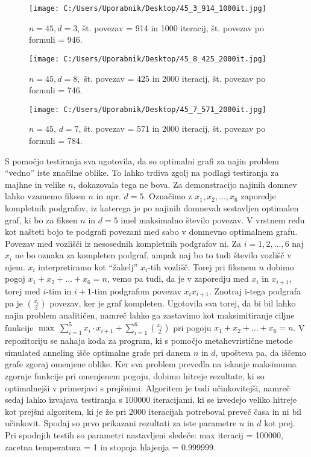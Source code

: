 \documentclass[12pt,a4paper]{amsart}
\theoremstyle{definition} %
\theoremstyle{plain} %
\begin{document}
\begin{figure}[h]
    \centering
    \texttt{[image: C:/Users/Uporabnik/Desktop/45\_3\_914\_1000it.jpg]} 
    \caption{$n = 45, d = 3$, št. povezav = 914 in 1000 iteracij, št. povezav po formuli = 946.}
    \label{fig:slika3}
\end{figure}

\break

\begin{figure}[h]
    \centering
    \texttt{[image: C:/Users/Uporabnik/Desktop/45\_8\_425\_2000it.jpg]} 
    \caption{$n = 45, d = 8,$ št. povezav = 425 in 2000 iteracij, št. povezav po formuli = 746.}
    \label{fig:slika3}
\end{figure}

\begin{figure}[h]
    \centering
    \texttt{[image: C:/Users/Uporabnik/Desktop/45\_7\_571\_2000it.jpg]} 
    \caption{$n = 45$, $d = 7$, št. povezav = 571 in 2000 iteracij, št. povezav po formuli = 784.}
    \label{fig:slika3}
\end{figure}

\noindent S pomočjo testiranja sva ugotovila, da so optimalni grafi za najin problem \enquote{vedno} iste značilne oblike.
To lahko trdiva zgolj na podlagi testiranja za majhne in velike $n$, dokazovala tega ne bova. 
Za demonstracijo najinih domnev lahko vzamemo fiksen $n$ in npr. $d = 5$. Označimo z $ x_1, x_2, \ldots, x_6 $ zaporedje kompletnih 
podgrafov, iz katerega je po najinih domnevah sestavljen optimalen graf, ki bo za fiksen $n$ in $d = 5$ imel maksimalno število povezav.
V vrstnem redu kot našteti bojo te podgrafi povezani med sabo v domnevno optimalnem grafu. Povezav med vozlišči iz nesosednih kompletnih podgrafov ni.
Za $i = 1, 2, \ldots, 6$ naj $x_i$ ne bo oznaka za kompleten podgraf, ampak naj bo to tudi število vozlišč v njem. $x_i$ interpretiramo kot \enquote{žakelj}
$x_i$-tih vozlišč.
Torej pri fiksnem $n$ dobimo pogoj $ x_1 + x_2 + \ldots + x_6 = n $, vemo pa tudi, da je v zaporedju med $x_i$ in $x_{i+1}$, torej 
med $i$-tim in $i+1$-tim podgrafom povezav $x_ix_{i+1}$.
Znotraj i-tega podgrafa pa je $\binom{x_i}{2}$ povezav, ker je graf kompleten. Ugotovila sva torej, da bi bil lahko najin problem 
analitičen, namreč lahko ga zastavimo kot maksimitiranje ciljne funkcije $\max\ \sum_{i=1}^{5} x_i \cdot x_{i+1} + \sum_{i=1}^{6} \binom{x_i}{2} $ 
pri pogoju $ x_1 + x_2 + \ldots + x_6 = n $. V repozitoriju se nahaja koda za program, ki s pomočjo metahevristične metode simulated anneling
išče optimalne grafe pri danem $n$ in $d$, upošteva pa, da iščemo grafe zgoraj omenjene oblike. Ker sva problem prevedla na iskanje maksimuma zgornje funkcije pri omenjenem
pogoju, dobimo hitreje rezultate, ki so optimalnejši v primerjavi s prejšnimi. Algoritem je tudi učinkovitejši, namreč sedaj lahko izvajava testiranja s 100000 iteracijami, ki se 
izvedejo veliko hitreje kot prejšni algoritem, ki je že pri 2000 iteracijah potreboval preveč časa in ni bil učinkovit. Spodaj so prvo prikazani rezultati za iste parametre $n$ in $d$ kot prej. 
Pri spodnjih testih so parametri nastavljeni sledeče: max iteracij = 100000, zacetna temperatura = 1 in stopnja hlajenja = 0.999999.
\end{document}
